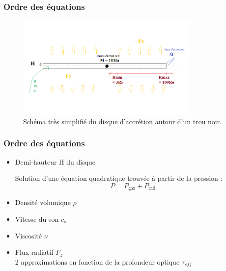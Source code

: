 
\begin{frame}
\frametitle{Ordre des équations}
      
   \begin{figure}[htb!]
      \includegraphics[width=9cm]{figures/bob_ross.png}
      \caption{Schéma très simplifié du disque d'accrétion autour d'un trou noir.}
   \end{figure}      
      \end{frame}

\begin{frame}
\frametitle{Ordre des équations}
         \begin{itemize}
      \item Demi-hauteur H du disque

      Solution d'une équation quadratique trouvée à partir de la pression :
      \begin{equation}
         P = P_\mathrm{gaz} + P_\mathrm{rad}
      \end{equation}
      \item Densité volumique $\rho$
      \item Vitesse du son $c_s$ 
      \item Viscosité $\nu$ 
      \item Flux radiatif $F_z$
      \\
      2 approximations en fonction de la profondeur optique $\tau_{eff}$
   \end{itemize}
\end{frame}



